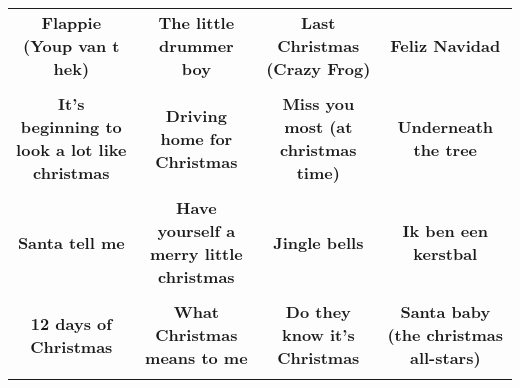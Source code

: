 \documentclass[12pt]{article} \usepackage{eso-pic, graphicx}
\newcommand{\background}[1]{%
\AddToShipoutPictureBG*{\texttt{[image: \#1]}}
}
\begin{document}
\tabcolsep=30.2pt \renewcommand{\arraystretch}{4.5}   \vspace*{4.3cm} \begin{center}  \begin{tabular}{c c c c}
\parbox{3cm}{\centering \textbf{Flappie (Youp van t hek)}}& 
\parbox{3cm}{\centering \textbf{The little drummer boy}}& 
\parbox{3cm}{\centering \textbf{Last Christmas (Crazy Frog)}}& 
\parbox{3cm}{\centering \textbf{Feliz Navidad}}\\ \\ 
\parbox{3cm}{\centering \textbf{It’s beginning to look a lot like christmas}}& 
\parbox{3cm}{\centering \textbf{Driving home for Christmas}}& 
\parbox{3cm}{\centering \textbf{Miss you most (at christmas time)}}& 
\parbox{3cm}{\centering \textbf{Underneath the tree}}\\ \\ 
\parbox{3cm}{\centering \textbf{Santa tell me}}& 
\parbox{3cm}{\centering \textbf{Have yourself a merry little christmas}}& 
\parbox{3cm}{\centering \textbf{Jingle bells}}& 
\parbox{3cm}{\centering \textbf{Ik ben een kerstbal}}\\ \\ 
\parbox{3cm}{\centering \textbf{12 days of Christmas}}& 
\parbox{3cm}{\centering \textbf{What Christmas means to me}}& 
\parbox{3cm}{\centering \textbf{Do they know it's Christmas}}& 
\parbox{3cm}{\centering \textbf{Santa baby (the christmas all-stars)}}\\ \\ 
\end{tabular} \background{discobingo.pdf} \end{center} 
\end{document}
